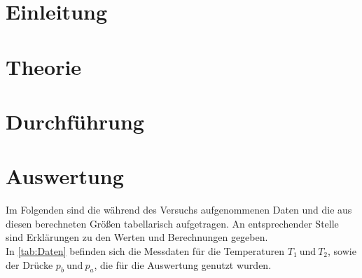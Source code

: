 


	\section{Einleitung}\label{Einleitung}
	
	
	
	
	
	
	\section{Theorie}\label{Theorie}
	
	
	
	\section{Durchführung}\label{Durchführung}
	
	
	
	\section{Auswertung}\label{Auswertung}
		Im Folgenden sind die während des Versuchs aufgenommenen Daten und die aus diesen
		berechneten Größen tabellarisch aufgetragen. An entsprechender Stelle sind Erklärungen
		zu den Werten und Berechnungen gegeben.\\
		
		In \autoref*{tab:Daten} befinden sich die Messdaten für die Temperaturen $T_{1}\ \text{und}\ T_{2}$,
		sowie der Drücke $p_{b}\ \text{und}\ p_{a}$, die für die Auswertung genutzt wurden.
		
